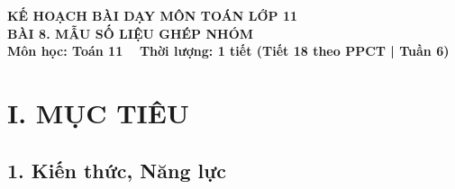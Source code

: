 \documentclass[12pt, a4paper]{article}
\begin{document}
\begin{center}
    {\fontsize{14pt}{17pt}\selectfont \textbf{KẾ HOẠCH BÀI DẠY MÔN TOÁN LỚP 11}}\\[6pt]
    {\fontsize{16pt}{19pt}\selectfont \textbf{BÀI 8. MẪU SỐ LIỆU GHÉP NHÓM}}\\[4pt]
    {\fontsize{12pt}{15pt}\selectfont \textbf{Môn học: Toán 11} \ \textbar \ \textbf{Thời lượng: 1 tiết (Tiết 18 theo PPCT | Tuần 6)}}
\end{center}

\vspace{5pt}

\section*{I. MỤC TIÊU}

\subsection*{1. Kiến thức, Năng lực}
\end{document}
